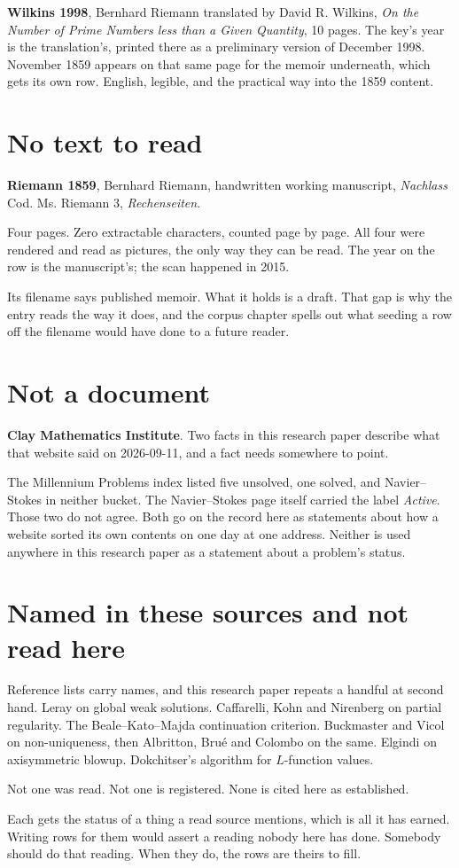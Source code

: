 \textbf{Wilkins 1998}, Bernhard Riemann translated by David R. Wilkins, \emph{On the Number of
Prime Numbers less than a Given Quantity}, 10 pages. The key's year is the translation's, printed
there as a preliminary version of December 1998. November 1859 appears on that same page for the
memoir underneath, which gets its own row. English, legible, and the practical way into the 1859
content.

\section{No text to read}

\textbf{Riemann 1859}, Bernhard Riemann, handwritten working manuscript, \emph{Nachlass} Cod. Ms.
Riemann 3, \emph{Rechenseiten}.

Four pages. Zero extractable characters, counted page by page. All four were rendered and read as
pictures, the only way they can be read. The year on the row is the manuscript's; the scan happened
in 2015.

Its filename says published memoir. What it holds is a draft. That gap is why the entry reads the
way it does, and the corpus chapter spells out what seeding a row off the filename would have done
to a future reader.

\section{Not a document}

\textbf{Clay Mathematics Institute}. Two facts in this research paper describe what that website said on
2026-09-11, and a fact needs somewhere to point.

The Millennium Problems index listed five unsolved, one solved, and Navier--Stokes in neither
bucket. The Navier--Stokes page itself carried the label \emph{Active}. Those two do not agree.
Both go on the record here as statements about how a website sorted its own contents on one day at
one address. Neither is used anywhere in this research paper as a statement about a problem's status.

\section{Named in these sources and not read here}

Reference lists carry names, and this research paper repeats a handful at second hand. Leray on global weak
solutions. Caffarelli, Kohn and Nirenberg on partial regularity. The Beale--Kato--Majda continuation
criterion. Buckmaster and Vicol on non-uniqueness, then Albritton, Bru\'e and Colombo on the same.
Elgindi on axisymmetric blowup. Dokchitser's algorithm for $L$-function values.

Not one was read. Not one is registered. None is cited here as established.

Each gets the status of a thing a read source mentions, which is all it has earned. Writing rows for
them would assert a reading nobody here has done. Somebody should do that reading. When they do, the
rows are theirs to fill.
